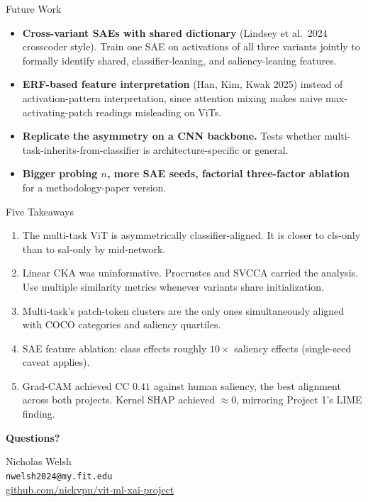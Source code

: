 \documentclass{beamer}
\begin{document}
\begin{frame}{Future Work}
\footnotesize
\begin{itemize}\setlength\itemsep{3pt}
\item \textbf{Cross-variant SAEs with shared dictionary} (Lindsey et al.\ 2024 crosscoder style). Train one SAE on activations of all three variants jointly to formally identify shared, classifier-leaning, and saliency-leaning features.
\item \textbf{ERF-based feature interpretation} (Han, Kim, Kwak 2025) instead of activation-pattern interpretation, since attention mixing makes naive max-activating-patch readings misleading on ViTs.
\item \textbf{Replicate the asymmetry on a CNN backbone.} Tests whether multi-task-inherits-from-classifier is architecture-specific or general.
\item \textbf{Bigger probing $n$, more SAE seeds, factorial three-factor ablation} for a methodology-paper version.
\end{itemize}
\end{frame}

\begin{frame}{Five Takeaways}
\footnotesize
\begin{enumerate}\setlength\itemsep{2pt}
\item The multi-task ViT is asymmetrically classifier-aligned. It is closer to cls-only than to sal-only by mid-network.
\item Linear CKA was uninformative. Procrustes and SVCCA carried the analysis. Use multiple similarity metrics whenever variants share initialization.
\item Multi-task's patch-token clusters are the only ones simultaneously aligned with COCO categories and saliency quartiles.
\item SAE feature ablation: class effects roughly $10\times$ saliency effects (single-seed caveat applies).
\item Grad-CAM achieved CC $0.41$ against human saliency, the best alignment across both projects. Kernel SHAP achieved $\approx 0$, mirroring Project 1's LIME finding.
\end{enumerate}
\end{frame}

\begin{frame}
\begin{center}
\Large\textbf{Questions?}

\vfill
\normalsize
Nicholas Welsh \\
\texttt{nwelsh2024@my.fit.edu} \\
\vspace{0.5cm}
\href{https://github.com/nickvpn/vit-ml-xai-project}{github.com/nickvpn/vit-ml-xai-project}
\end{center}
\end{frame}
\end{document}
